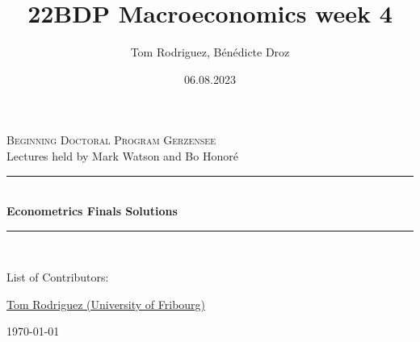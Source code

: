 \documentclass[12pt]{article}
\title{22BDP Macroeconomics week 4}
\author{Tom Rodriguez, Bénédicte Droz}
\date{06.08.2023}
\begin{document}
\begin{titlepage}
	
	\newcommand{\HRule}{\rule{\linewidth}{0.5mm}} %
	
	\center %
	
	
	\textsc{\large Beginning Doctoral Program Gerzensee}\\[0.5cm] %
	{\large Lectures held by Mark Watson and Bo Honor\'e}\\[1cm] %
	
	
	
	\HRule \\[1.0cm]
	{ \LARGE \bfseries Econometrics Finals Solutions}\\[0.4cm] %
	\HRule \\[2cm]
	
	

	
	\begin{flushleft}
        \Large List of Contributors:
        
		{\large 
            \href{https://rodrigueztom.github.io}{Tom Rodriguez (University of Fribourg)}
        }
	\end{flushleft}
	
	
	
	{\large \today} %
	
	\vfill 
	
\end{titlepage}
\end{document}
